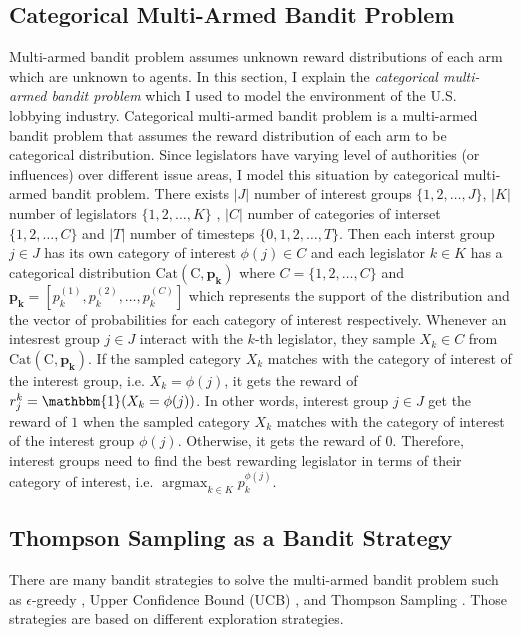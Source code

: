 \documentclass{article}
\begin{document}
\subsection{\large{ 
Categorical Multi-Armed Bandit Problem}} \label{vanilla}

Multi-armed bandit problem 
assumes unknown reward distributions 
of each arm
which are unknown to agents.
In this section, I explain 
the \textit{categorical multi-armed bandit problem}\label{categorical}
which I used to model the 
environment of the U.S. lobbying industry.
Categorical multi-armed bandit problem
is a multi-armed bandit problem
that assumes the reward distribution of each arm to be categorical distribution.
Since legislators have varying level of authorities (or influences) 
over different issue areas,
I model this situation by categorical multi-armed bandit problem. There exists $|J|$ number of interest groups 
$\{1, 2, \hdots, J\}$, $|K|$ number of legislators $\{1, 2, \hdots, K\}$ 
, $|C|$ number of categories of interset $\{1,2, \hdots, C\}$ and
$|T|$ number of timesteps $\{0, 1, 2, \hdots, T\}$.  
Then each interst group $j \in J$ has its 
own category of interest $\phi(j) \in C$ and
each legislator $k \in K$ has a categorical distribution 
$\operatorname{Cat(C, \mathbf{p_k})}$ where
$C=\{1,2,\hdots, C\}$ and $\mathbf{p_k} = [p_k^{(1)}, p_k^{(2)}, \hdots, p_k^{(C)}]$
which represents the support of the distribution
and the vector of probabilities for each category of interest respectively.
Whenever an intesrest group $j \in J$ interact with the $k$-th legislator, they
sample $X_k \in C$ from $\operatorname{Cat(C, \mathbf{p_k})}$.
If the sampled category $X_k$ matches with the category of interest of the interest group, i.e. 
$X_k = \phi(j)$,
it gets the reward of $r_j^k = \mathbbm{1}(X_{k} = \phi(j))$. 
In other words, 
interest group $j \in J$
get the reward of $1$
when the sampled category $X_k$ matches with the category of interest of the interest group $\phi(j)$.
Otherwise, it gets the reward of $0$.
Therefore, interest groups 
need to find the best rewarding 
legislator in terms of their category of interest, i.e. 
$\operatorname{argmax}_{k \in K} p_k^{\phi(j)}$.


\subsection{\large{Thompson Sampling as a Bandit Strategy}}
There are many bandit strategies to solve the multi-armed bandit problem
such as $\epsilon$-greedy \citep{egrdy}, Upper Confidence Bound (UCB) \citep{ucb}, and Thompson Sampling \citep{tom}.
Those strategies are based on different exploration strategies.
\end{document}
